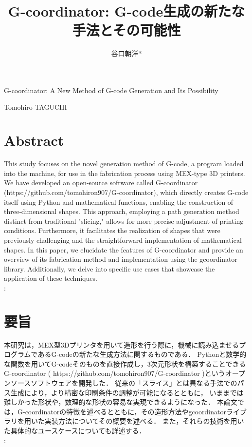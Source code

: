 \documentclass{article}
\begin{document}
\title{G-coordinator: G-code生成の新たな手法とその可能性}
\author{谷口朝洋*}
\maketitle

\begin{center}
  \large
  G-coordinator: A New Method of G-code Generation and Its Possibility
  
  Tomohiro TAGUCHI
\end{center}




\section*{Abstract}

This study focuses on the novel generation method of G-code, a program loaded into the machine,
  for use in the fabrication process using MEX-type 3D printers.
  We have developed an open-source software called G-coordinator (https://github.com/tomohiron907/G-coordinator), 
  which directly creates G-code itself using Python and mathematical functions, 
  enabling the construction of three-dimensional shapes. 
  This approach, employing a path generation method distinct from traditional "slicing," 
  allows for more precise adjustment of printing conditions. 
  Furthermore, it facilitates the realization of shapes that were previously challenging and 
  the straightforward implementation of mathematical shapes.
In this paper, we elucidate the features of G-coordinator and provide an overview of its fabrication method 
and implementation using the gcoordinator library. 
Additionally, we delve into specific use cases that showcase the application of these techniques.\\
: 

\section*{要旨}
本研究は，MEX型3Dプリンタを用いて造形を行う際に，機械に読み込ませるプログラムであるG-codeの新たな生成方法に関するものである．
Pythonと数学的な関数を用いてG-codeそのものを直接作成し，3次元形状を構築することできるG-coordinator 
( https://github.com/tomohiron907/G-coordinator )というオープンソースソフトウェアを開発した．
従来の「スライス」とは異なる手法でのパス生成により，より精密な印刷条件の調整が可能になるとともに，
いままでは難しかった形状や，数理的な形状の容易な実現できるようになった．
本論文では，G-coordinatorの特徴を述べるとともに，その造形方法やgcoordinatorライブラリを用いた実装方法についてその概要を述べる．
また，それらの技術を用いた具体的なユースケースについても詳述する．\\
: 
\end{document}
